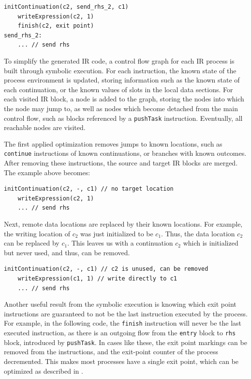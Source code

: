 \begin{minipage}{0.9\linewidth}
\begin{lstlisting}[language=IR, frame=bottom]
    initContinuation(c2, send_rhs_2, c1)
    writeExpression(c2, 1)
    finish(c2, exit point)
send_rhs_2:
    ... // send rhs
\end{lstlisting}
\end{minipage}

To simplify the generated \ac{IR} code, a control flow graph for each \ac{IR} process is built through symbolic execution. For each instruction, the known state of the process environment is updated, storing information such as the known state of each continuation, or the known values of slots in the local data sections. For each visited \ac{IR} block, a node is added to the graph, storing the nodes into which the node may jump to, as well as nodes which become detached from the main control flow, such as blocks referenced by a \texttt{pushTask} instruction. Eventually, all reachable nodes are visited.

The first applied optimization removes jumps to known locations, such as \texttt{continue} instructions of known continuations, or branches with known outcomes. After removing these instructions, the source and target \ac{IR} blocks are merged. The example above becomes:

\begin{lstlisting}[language=IR, frame=bottom]
    initContinuation(c2, -, c1) // no target location
    writeExpression(c2, 1)
    ... // send rhs
\end{lstlisting}

Next, remote data locations are replaced by their known locations. For example, the writing location of $c_2$ was just initialized to be $c_1$. Thus, the data location $c_2$ can be replaced by $c_1$. This leaves us with a continuation $c_2$ which is initialized but never used, and thus, can be removed.

\begin{lstlisting}[language=IR, frame=bottom]
    initContinuation(c2, -, c1) // c2 is unused, can be removed
    writeExpression(c1, 1) // write directly to c1
    ... // send rhs
\end{lstlisting}

Another useful result from the symbolic execution is knowing which exit point instructions are guaranteed to not be the last instruction executed by the process. For example, in the following code, the \texttt{finish} instruction will never be the last executed instruction, as there is an outgoing flow from the \texttt{entry} block to \texttt{rhs} block, introduced by \texttt{pushTask}. In cases like these, the exit point markings can be removed from the instructions, and the exit-point counter of the process decremented. This makes most processes have a single exit point, which can be optimized as described in .

